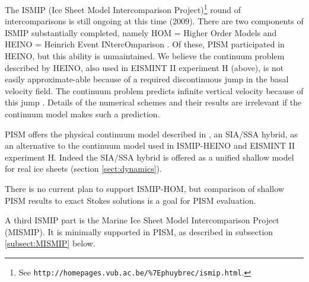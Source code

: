 \documentclass[11pt,final]{amsart}
\begin{document}
The ISMIP (Ice Sheet Model Intercomparison Project)\footnote{See \texttt{http://homepages.vub.ac.be/\%7Ephuybrec/ismip.html}.} round of intercomparisons is still ongoing at this time (2009).  There are two components of ISMIP substantially completed, namely HOM = Higher Order Models \cite{HOMtcd,HOMelmer} and HEINO = Heinrich Event INtercOmparison \cite{GreveTakahamaCalov}.  Of these, PISM participated in HEINO, but this ability is unmaintained.   We believe the continuum problem described by HEINO, also used in EISMINT II experiment H (above), is not easily approximate-able because of a required discontinuous jump in the basal velocity field.  The continuum problem predicts infinite vertical velocity because of this jump \cite[Appendix B]{BBssasliding}.  Details of the numerical schemes and their results are irrelevant if the continuum model makes such a prediction.

PISM offers the physical continuum model described in \cite{BBssasliding}, an SIA/SSA hybrid, as an alternative to the continuum model used in ISMIP-HEINO and EISMINT II experiment H.  Indeed the SIA/SSA hybrid is offered as a unified shallow model for real ice sheets (section \ref{sect:dynamics}).

There is no current plan to support ISMIP-HOM, but comparison of shallow PISM results to exact Stokes solutions is a goal for PISM evaluation.

A third ISMIP part is the Marine Ice Sheet Model Intercomparison Project (MISMIP).  It is minimally supported in PISM, as described in subsection \ref{subsect:MISMIP} below.
\end{document}
